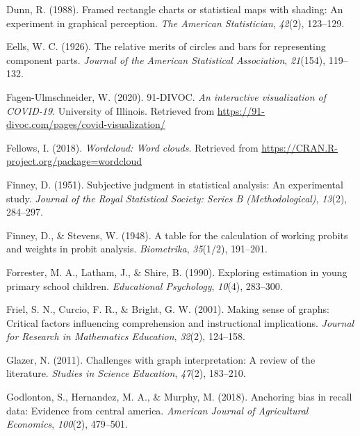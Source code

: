 \documentclass[print]{nuthesis}
\newlength{\cslhangindent}
\newenvironment{CSLReferences}[2]%
{\setlength{\parindent}{0pt}%
\everypar{\setlength{\hangindent}{\cslhangindent}}\ignorespaces}%
{\par}
\begin{document}
\begin{CSLReferences}{1}{0}
\leavevmode{}%
Dunn, R. (1988). Framed rectangle charts or statistical maps with shading: An experiment in graphical perception. \emph{The American Statistician}, \emph{42}(2), 123--129.

\leavevmode{}%
Eells, W. C. (1926). The relative merits of circles and bars for representing component parts. \emph{Journal of the American Statistical Association}, \emph{21}(154), 119--132.

\leavevmode{}%
Fagen-Ulmschneider, W. (2020). 91-DIVOC. \emph{An interactive visualization of COVID-19}. University of Illinois. Retrieved from \url{https://91-divoc.com/pages/covid-visualization/}

\leavevmode{}%
Fellows, I. (2018). \emph{Wordcloud: Word clouds}. Retrieved from \url{https://CRAN.R-project.org/package=wordcloud}

\leavevmode{}%
Finney, D. (1951). Subjective judgment in statistical analysis: An experimental study. \emph{Journal of the Royal Statistical Society: Series B (Methodological)}, \emph{13}(2), 284--297.

\leavevmode{}%
Finney, D., \& Stevens, W. (1948). A table for the calculation of working probits and weights in probit analysis. \emph{Biometrika}, \emph{35}(1/2), 191--201.

\leavevmode{}%
Forrester, M. A., Latham, J., \& Shire, B. (1990). Exploring estimation in young primary school children. \emph{Educational Psychology}, \emph{10}(4), 283--300.

\leavevmode{}%
Friel, S. N., Curcio, F. R., \& Bright, G. W. (2001). Making sense of graphs: Critical factors influencing comprehension and instructional implications. \emph{Journal for Research in Mathematics Education}, \emph{32}(2), 124--158.

\leavevmode{}%
Glazer, N. (2011). Challenges with graph interpretation: A review of the literature. \emph{Studies in Science Education}, \emph{47}(2), 183--210.

\leavevmode{}%
Godlonton, S., Hernandez, M. A., \& Murphy, M. (2018). Anchoring bias in recall data: Evidence from central america. \emph{American Journal of Agricultural Economics}, \emph{100}(2), 479--501.


\end{CSLReferences}
\end{document}
